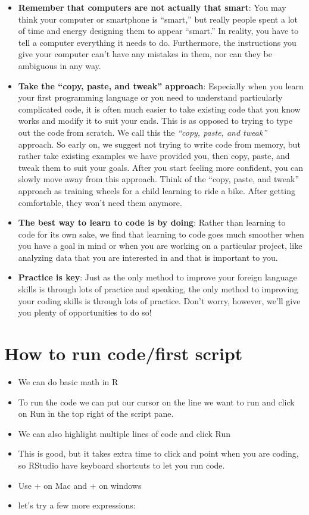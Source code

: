 \documentclass[]{book}
\providecommand{\tightlist}{%
  \setlength{\itemsep}{0pt}\setlength{\parskip}{0pt}}
\begin{document}
\begin{itemize}
\tightlist
\item
  \textbf{Remember that computers are not actually that smart}: You may think your computer or smartphone is ``smart,'' but really people spent a lot of time and energy designing them to appear ``smart.'' In reality, you have to tell a computer everything it needs to do. Furthermore, the instructions you give your computer can't have any mistakes in them, nor can they be ambiguous in any way.
\item
  \textbf{Take the ``copy, paste, and tweak'' approach}: Especially when you learn your first programming language or you need to understand particularly complicated code, it is often much easier to take existing code that you know works and modify it to suit your ends. This is as opposed to trying to type out the code from scratch. We call this the \emph{``copy, paste, and tweak''} approach. So early on, we suggest not trying to write code from memory, but rather take existing examples we have provided you, then copy, paste, and tweak them to suit your goals. After you start feeling more confident, you can slowly move away from this approach. Think of the ``copy, paste, and tweak'' approach as training wheels for a child learning to ride a bike. After getting comfortable, they won't need them anymore.
\item
  \textbf{The best way to learn to code is by doing}: Rather than learning to code for its own sake, we find that learning to code goes much smoother when you have a goal in mind or when you are working on a particular project, like analyzing data that you are interested in and that is important to you.
\item
  \textbf{Practice is key}: Just as the only method to improve your foreign language skills is through lots of practice and speaking, the only method to improving your coding skills is through lots of practice. Don't worry, however, we'll give you plenty of opportunities to do so!
\end{itemize}

\hypertarget{how-to-run-codefirst-script}{%
\section{How to run code/first script}\label{how-to-run-codefirst-script}}

\begin{itemize}
\tightlist
\item
  We can do basic math in R
\item
  To run the code we can put our cursor on the line we want to run and click on Run in the top right of the script pane.
\item
  We can also highlight multiple lines of code and click Run
\item
  This is good, but it takes extra time to click and point when you are coding, so RStudio have keyboard shortcuts to let you run code.
\item
  Use + on Mac and + on windows
\item
  let's try a few more expressions:
\end{itemize}
\end{document}
